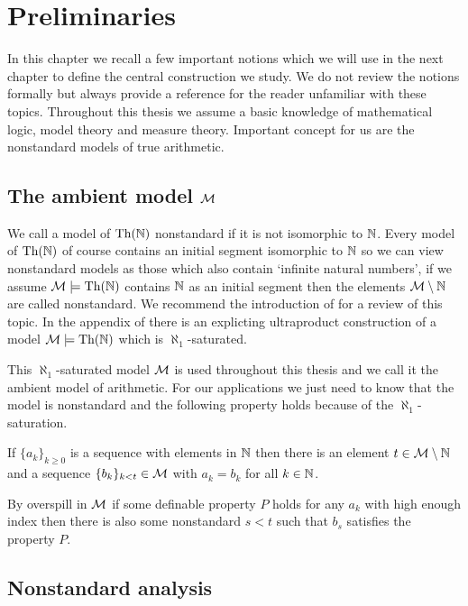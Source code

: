 \chapter*{Preliminaries}

In this chapter we recall a few important notions which we will use in the next chapter to define the central construction we study. We do not review the notions formally but always provide a reference for the reader unfamiliar with these topics. Throughout this thesis we assume a basic knowledge of mathematical logic, model theory and measure theory. Important concept for us are the nonstandard models of true arithmetic. 

\section*{The ambient model $\mathcal{M}$}

We call a model of $\text{Th}(\mathbb{N})$ nonstandard if it is not isomorphic to $\mathbb{N}$. Every model of $\text{Th}(\mathbb{N})$ of course contains an initial segment isomorphic to $\mathbb{N}$ so we can view nonstandard models as those which also contain `infinite natural numbers', if we assume $\mathcal{M}\models \text{Th}(\mathbb{N})$ contains $\mathbb{N}$ as an initial segment then the elements $\mathcal{M}\setminus \mathbb{N}$ are called nonstandard. We recommend the introduction of \cite{kaye1991pa} for a review of this topic. In the appendix of \cite{krajicek2010forcing} there is an explicting ultraproduct construction of a model $\mathcal{M}\models \text{Th}(\mathbb{N})$ which is $\aleph_1$-saturated.

This $\aleph_1$-saturated model $\mathcal{M}$ is used throughout this thesis and we call it the ambient model of arithmetic. For our applications we just need to know that the model is nonstandard and the following property holds because of the $\aleph_1$-saturation.

\begin{prope}
If $\{a_k\}_{k\geq 0}$ is a sequence with elements in $\mathbb{N}$ then there is an element $t\in \mathcal{M} \setminus \mathbb{N}$ and a sequence $\{b_k\}_{k<t}\in \mathcal{M}$ with $a_k=b_k$ for all $k\in \mathbb{N}$.
\end{prope}

By overspill in $\mathcal{M}$ if some definable property $P$ holds for any $a_k$ with high enough index then there is also some nonstandard $s<t$ such that $b_s$ satisfies the property $P$. 

\section*{Nonstandard analysis}

